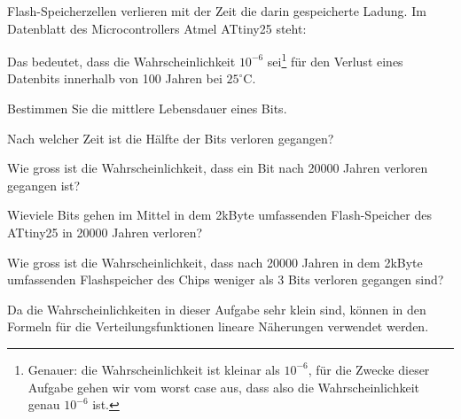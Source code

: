 Flash-Speicherzellen verlieren mit der Zeit die darin gespeicherte Ladung.
Im Datenblatt des Microcontrollers Atmel ATtiny25 steht:
\begin{center}
\end{center}
Das bedeutet, dass die
Wahrscheinlichkeit $10^{-6}$ sei\footnote{Genauer: die Wahrscheinlichkeit
ist kleinar als $10^{-6}$, für die Zwecke dieser Aufgabe gehen wir vom
worst case aus, dass also die Wahrscheinlichkeit genau $10^{-6}$ ist.}
für den Verlust eines Datenbits innerhalb
von 100 Jahren bei $25^\circ$C.
\begin{teilaufgaben}
\item Bestimmen Sie die mittlere Lebensdauer eines Bits.
\item Nach welcher Zeit ist die Hälfte der Bits verloren gegangen?
\item Wie gross ist die Wahrscheinlichkeit, dass ein Bit nach 20000
Jahren verloren gegangen ist?
\item Wieviele Bits gehen im Mittel in dem 2kByte umfassenden Flash-Speicher
des ATtiny25 in 20000 Jahren verloren?
\item Wie gross ist die Wahrscheinlichkeit, dass nach 20000 Jahren
in dem 2kByte umfassenden Flash\-speicher des Chips
weniger als 3 Bits verloren gegangen sind?
\end{teilaufgaben}

\begin{hinweis}
Da die Wahrscheinlichkeiten in dieser Aufgabe sehr klein sind, können
in den Formeln für die Verteilungsfunktionen lineare Näherungen
verwendet werden.
\end{hinweis}


